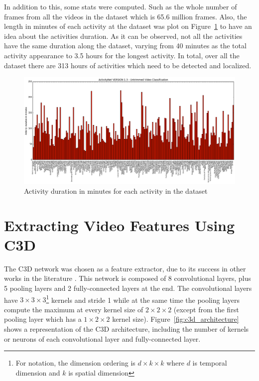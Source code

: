 
In addition to this, some stats were computed. Such as the whole number of frames from all the videos in the dataset which is 65.6 million frames. Also, the length in minutes of each activity at the dataset was plot on Figure~\ref{fig:dataset_stats} to have an idea about the activities duration. As it can be observed, not all the activities have the same duration along the dataset, varying from 40 minutes as the total activity appearance to 3.5 hours for the longest activity. In total, over all the dataset there are 313 hours of activities which need to be detected and localized.

\begin{figure}[H]
\begin{center}
\includegraphics[width=1\linewidth]{img/methodology/dataset_stats}
\end{center}
\caption{Activity duration in minutes for each activity in the dataset}
\label{fig:dataset_stats}
\end{figure}

\section{Extracting Video Features Using C3D}

The C3D network\cite{tran2014learning} was chosen as a feature extractor, due to its success in other works in the literature \cite{baccouche2011sequential,tran2015deep,tran2014learning,shoutemporal}. This network is composed of 8 convolutional layers, plus 5 pooling layers and 2 fully-connected layers at the end. The convolutional layers have $3 \times 3 \times 3$\footnote{For notation, the dimension ordering is $d \times k \times k$ where $d$ is temporal dimension and $k$ is spatial dimension} kernels and stride 1 while at the same time the pooling layers compute the maximum at every kernel size of $2 \times 2 \times 2$ (except from the first pooling layer which has a $1 \times 2 \times 2$ kernel size). Figure~\ref{fig:c3d_architecture} shows a representation of the C3D architecture, including the number of kernels or neurons of each convolutional layer and fully-connected layer.

